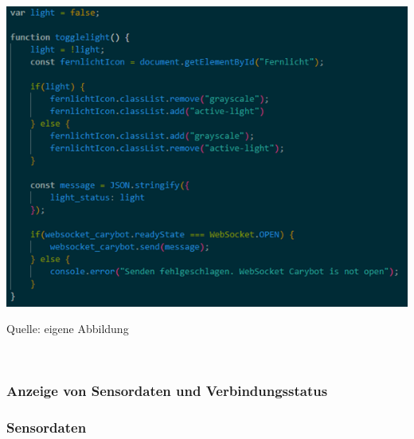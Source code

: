 \documentclass[ngerman,12pt,a4paper]{article}
\begin{document}
	\begin{center}
		\begin{minipage}[t]{0.95\textwidth}
			\includegraphics[scale=0.9]{Pictures/fernlicht-js}
			\label{fig:fernlicht-js}
			\vspace{-10pt}
			\begin{center}
				\par\small Quelle: eigene Abbildung 
			\end{center}
		\end{minipage} \\[0.75cm]
	\end{center}
			
			\subsubsection{Anzeige von Sensordaten und Verbindungsstatus}
			
				\subsubsection*{Sensordaten}	
			
\end{document}
